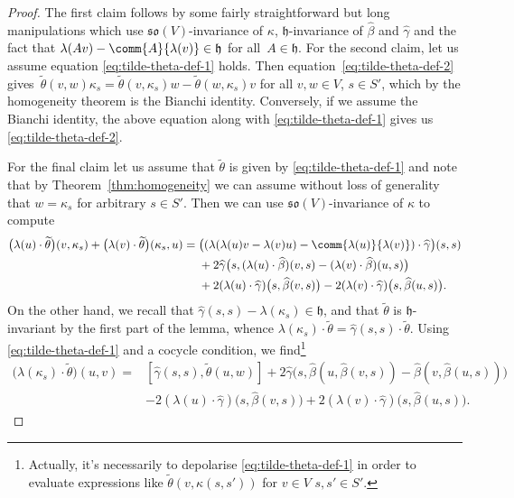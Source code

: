 \documentclass[10pt,a4paper]{amsart}
\numberwithin{equation}{section}
\newcommand{\fh}{\mathfrak{h}}
\newcommand{\fso}{\mathfrak{so}}
\newcommand{\betahat}{\widehat{\beta}}
\newcommand{\gammahat}{\widehat{\gamma}}
\newcommand{\thetatilde}{\widetilde{\theta}}
\newcommand{\1}{\mathbbm{1}}
\begin{document}
\begin{proof}
	The first claim follows by some fairly straightforward but long manipulations which use $\fso(V)$-invariance of $\kappa$, $\fh$-invariance of $\betahat$ and $\gammahat$ and the fact that $\lambda(Av)-\comm{A}{\lambda(v)}\in\fh$ for all~${A\in\fh}$. For the second claim, let us assume equation \eqref{eq:tilde-theta-def-1} holds. Then equation~\eqref{eq:tilde-theta-def-2} gives~${\thetatilde(v,w)\kappa_s = \thetatilde(v,\kappa_s)w - \thetatilde(w,\kappa_s)v}
$
	for all $v,w\in V$, $s\in S'$, which by the homogeneity theorem is the Bianchi identity. Conversely, if we assume the Bianchi identity, the above equation along with \eqref{eq:tilde-theta-def-1} gives us \eqref{eq:tilde-theta-def-2}.
	
	For the final claim let us assume that $\thetatilde$ is given by \eqref{eq:tilde-theta-def-1} and note that by Theorem~\ref{thm:homogeneity} we can assume without loss of generality that $w=\kappa_s$ for arbitrary $s\in S'$. Then we can use $\fso(V)$-invariance of $\kappa$ to compute
	\begin{align*}
		\bigl(\lambda(u)\cdot\thetatilde\bigr)(v,\kappa_s) + \bigl(\lambda(v)\cdot\thetatilde\bigr)(\kappa_s,u)
			={}& \bigl((\lambda(\lambda(u)v-\lambda(v)u)
				- \comm{\lambda(u)}{\lambda(v)})\cdot\gammahat\bigr)(s,s) \\
				& + 2\gammahat\bigl(s,(\lambda(u)\cdot\betahat)(v,s)
				- (\lambda(v)\cdot\betahat)(u,s)\bigr)\\
				& + 2(\lambda(u)\cdot\gammahat)\bigl(s,\betahat(v,s)\bigr)
				- 2(\lambda(v)\cdot\gammahat)\bigl(s,\betahat(u,s)\bigr).
	\end{align*}
	On the other hand, we recall that $\gammahat(s,s)-\lambda(\kappa_s)\in\fh$, and that $\thetatilde$ is $\fh$-invariant by the first part of the lemma, whence $\lambda(\kappa_s)\cdot\thetatilde=\gammahat(s,s)\cdot\thetatilde$. Using \eqref{eq:tilde-theta-def-1} and a cocycle condition, we find\footnote{Actually, it's necessarily to depolarise \eqref{eq:tilde-theta-def-1} in order to evaluate expressions like $\thetatilde(v,\kappa(s,s'))$ for $v\in V$ $s,s'\in S'$.}
	\begin{align*}
		\bigl(\lambda(\kappa_s)\cdot\thetatilde\bigr)(u,v) ={}& [\gammahat(s,s),\thetatilde(u,w)]
			+ 2\gammahat\bigl(s,\betahat(u,\betahat(v,s))-\betahat(v,\betahat(u,s))\bigr)\\
			& - 2(\lambda(u)\cdot\gammahat)\bigl(s,\betahat(v,s)\bigr)
			+ 2(\lambda(v)\cdot\gammahat)\bigl(s,\betahat(u,s)\bigr).
	\end{align*}

\end{proof}
\end{document}
